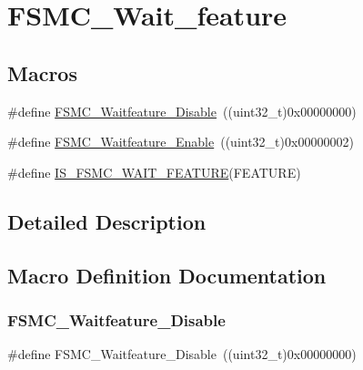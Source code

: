 \hypertarget{group___f_s_m_c___wait__feature}{}\section{F\+S\+M\+C\+\_\+\+Wait\+\_\+feature}
\label{group___f_s_m_c___wait__feature}
\subsection*{Macros}
\begin{DoxyCompactItemize}
\item 
\#define \mbox{\hyperlink{group___f_s_m_c___wait__feature_ga8a31f05576e66546fbbcdb06ff67da7d}{F\+S\+M\+C\+\_\+\+Waitfeature\+\_\+\+Disable}}~((uint32\+\_\+t)0x00000000)
\item 
\#define \mbox{\hyperlink{group___f_s_m_c___wait__feature_ga3113366130dfbf6d116f1afb94af1726}{F\+S\+M\+C\+\_\+\+Waitfeature\+\_\+\+Enable}}~((uint32\+\_\+t)0x00000002)
\item 
\#define \mbox{\hyperlink{group___f_s_m_c___wait__feature_ga07c2585b517df2c7afbe3ba16c22f236}{I\+S\+\_\+\+F\+S\+M\+C\+\_\+\+W\+A\+I\+T\+\_\+\+F\+E\+A\+T\+U\+RE}}(F\+E\+A\+T\+U\+RE)
\end{DoxyCompactItemize}


\subsection{Detailed Description}


\subsection{Macro Definition Documentation}
\mbox{\label{group___f_s_m_c___wait__feature_ga8a31f05576e66546fbbcdb06ff67da7d}} 
\subsubsection{\texorpdfstring{FSMC\_Waitfeature\_Disable}{FSMC\_Waitfeature\_Disable}}
{\footnotesize\ttfamily \#define F\+S\+M\+C\+\_\+\+Waitfeature\+\_\+\+Disable~((uint32\+\_\+t)0x00000000)}

\mbox{\label{group___f_s_m_c___wait__feature_ga3113366130dfbf6d116f1afb94af1726}} 
